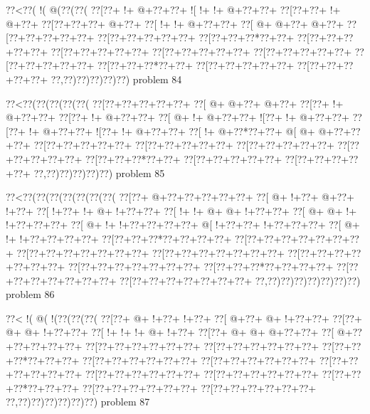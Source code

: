 \vbox{\vbox{\goo
\0??<\0??(\- !(\- @(\0??(\0??(
\0??[\0??+\- !+\- @+\0??+\0??+
\- ![\- !+\- !+\- @+\0??+\0??+
\0??[\0??+\0??+\- !+\- @+\0??+
\0??[\0??+\0??+\0??+\- @+\0??+
\0??[\- !+\- !+\- @+\0??+\0??+
\0??[\- @+\- @+\0??+\- @+\0??+
\0??[\0??+\0??+\0??+\0??+\0??+
\0??[\0??+\0??+\0??+\0??+\0??+
\0??[\0??+\0??+\0??*\0??+\0??+
\0??[\0??+\0??+\0??+\0??+\0??+
\0??[\0??+\0??+\0??+\0??+\0??+
\0??[\0??+\0??+\0??+\0??+\0??+
\0??[\0??+\0??+\0??+\0??+\0??+
\0??[\0??+\0??+\0??+\0??+\0??+
\0??[\0??+\0??+\0??*\0??+\0??+
\0??[\0??+\0??+\0??+\0??+\0??+
\0??[\0??+\0??+\0??+\0??+\0??+
\0??,\0??)\0??)\0??)\0??)\0??)
}
\hfil problem 84\hfil\break
}

\vbox{\vbox{\goo
\0??<\0??(\0??(\0??(\0??(\0??(
\0??[\0??+\0??+\0??+\0??+\0??+
\0??[\- @+\- @+\0??+\- @+\0??+
\0??[\0??+\- !+\- @+\0??+\0??+
\0??[\0??+\- !+\- @+\0??+\0??+
\0??[\- @+\- !+\- @+\0??+\0??+
\- ![\0??+\- !+\- @+\0??+\0??+
\0??[\0??+\- !+\- @+\0??+\0??+
\- ![\0??+\- !+\- @+\0??+\0??+
\0??[\- !+\- @+\0??*\0??+\0??+
\- @[\- @+\- @+\0??+\0??+\0??+
\0??[\0??+\0??+\0??+\0??+\0??+
\0??[\0??+\0??+\0??+\0??+\0??+
\0??[\0??+\0??+\0??+\0??+\0??+
\0??[\0??+\0??+\0??+\0??+\0??+
\0??[\0??+\0??+\0??*\0??+\0??+
\0??[\0??+\0??+\0??+\0??+\0??+
\0??[\0??+\0??+\0??+\0??+\0??+
\0??,\0??)\0??)\0??)\0??)\0??)
}
\hfil problem 85\hfil\break
}

\vbox{\vbox{\goo
\0??<\0??(\0??(\0??(\0??(\0??(\0??(\0??(
\0??[\0??+\- @+\0??+\0??+\0??+\0??+\0??+
\0??[\- @+\- !+\0??+\- @+\0??+\- !+\0??+
\0??[\- !+\0??+\- !+\- @+\- !+\0??+\0??+
\0??[\- !+\- !+\- @+\- @+\- !+\0??+\0??+
\0??[\- @+\- @+\- !+\- !+\0??+\0??+\0??+
\0??[\- @+\- !+\- !+\0??+\0??+\0??+\0??+
\- @[\- !+\0??+\0??+\- !+\0??+\0??+\0??+
\0??[\- @+\- !+\- !+\0??+\0??+\0??+\0??+
\0??[\0??+\0??+\0??*\0??+\0??+\0??+\0??+
\0??[\0??+\0??+\0??+\0??+\0??+\0??+\0??+
\0??[\0??+\0??+\0??+\0??+\0??+\0??+\0??+
\0??[\0??+\0??+\0??+\0??+\0??+\0??+\0??+
\0??[\0??+\0??+\0??+\0??+\0??+\0??+\0??+
\0??[\0??+\0??+\0??+\0??+\0??+\0??+\0??+
\0??[\0??+\0??+\0??*\0??+\0??+\0??+\0??+
\0??[\0??+\0??+\0??+\0??+\0??+\0??+\0??+
\0??[\0??+\0??+\0??+\0??+\0??+\0??+\0??+
\0??,\0??)\0??)\0??)\0??)\0??)\0??)\0??)
}
\hfil problem 86\hfil\break
}

\vbox{\vbox{\goo
\0??<\- !(\- @(\- !(\0??(\0??(\0??(
\0??[\0??+\- @+\- !+\0??+\- !+\0??+
\0??[\- @+\0??+\- @+\- !+\0??+\0??+
\0??[\0??+\- @+\- @+\- !+\0??+\0??+
\0??[\- !+\- !+\- !+\- @+\- !+\0??+
\0??[\0??+\- @+\- @+\- @+\0??+\0??+
\0??[\- @+\0??+\0??+\0??+\0??+\0??+
\0??[\0??+\0??+\0??+\0??+\0??+\0??+
\0??[\0??+\0??+\0??+\0??+\0??+\0??+
\0??[\0??+\0??+\0??*\0??+\0??+\0??+
\0??[\0??+\0??+\0??+\0??+\0??+\0??+
\0??[\0??+\0??+\0??+\0??+\0??+\0??+
\0??[\0??+\0??+\0??+\0??+\0??+\0??+
\0??[\0??+\0??+\0??+\0??+\0??+\0??+
\0??[\0??+\0??+\0??+\0??+\0??+\0??+
\0??[\0??+\0??+\0??*\0??+\0??+\0??+
\0??[\0??+\0??+\0??+\0??+\0??+\0??+
\0??[\0??+\0??+\0??+\0??+\0??+\0??+
\0??,\0??)\0??)\0??)\0??)\0??)\0??)
}
\hfil problem 87\hfil\break
}


